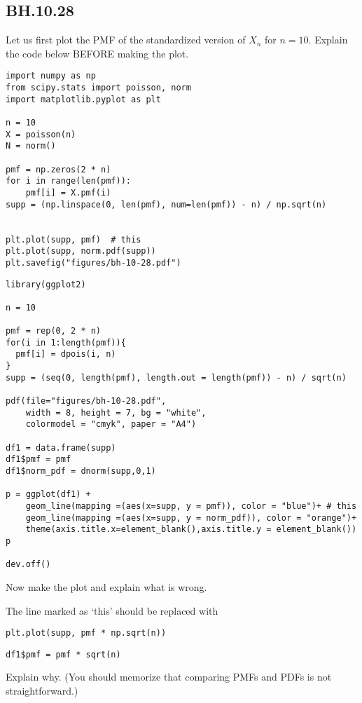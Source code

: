

\subsection{BH.10.28}

\begin{exercise}
Let us first plot the PMF of the standardized version of $X_{n}$ for $n=10$. Explain the code below BEFORE making the plot.
\end{exercise}

\begin{verbatim}
import numpy as np
from scipy.stats import poisson, norm
import matplotlib.pyplot as plt

n = 10
X = poisson(n)
N = norm()

pmf = np.zeros(2 * n)
for i in range(len(pmf)):
    pmf[i] = X.pmf(i)
supp = (np.linspace(0, len(pmf), num=len(pmf)) - n) / np.sqrt(n)


plt.plot(supp, pmf)  # this
plt.plot(supp, norm.pdf(supp))
plt.savefig("figures/bh-10-28.pdf")
\end{verbatim}

\begin{verbatim}
library(ggplot2)  

n = 10

pmf = rep(0, 2 * n)
for(i in 1:length(pmf)){
  pmf[i] = dpois(i, n)
}
supp = (seq(0, length(pmf), length.out = length(pmf)) - n) / sqrt(n)

pdf(file="figures/bh-10-28.pdf",
    width = 8, height = 7, bg = "white",          
    colormodel = "cmyk", paper = "A4")

df1 = data.frame(supp)
df1$pmf = pmf 
df1$norm_pdf = dnorm(supp,0,1)

p = ggplot(df1) +
    geom_line(mapping =(aes(x=supp, y = pmf)), color = "blue")+ # this
    geom_line(mapping =(aes(x=supp, y = norm_pdf)), color = "orange")+
    theme(axis.title.x=element_blank(),axis.title.y = element_blank())
p

dev.off()
\end{verbatim}

\begin{exercise}
Now make the plot and  explain what is wrong.
\end{exercise}

\begin{exercise}
The line  marked as `this' should be replaced with
\begin{verbatim}
plt.plot(supp, pmf * np.sqrt(n))
\end{verbatim}

\begin{verbatim}
df1$pmf = pmf * sqrt(n) 
\end{verbatim}
Explain why.  (You should memorize  that comparing PMFs and PDFs is not straightforward.)
\end{exercise}


